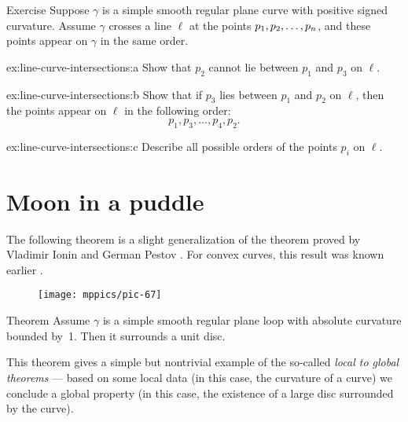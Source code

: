 \begin{thm}{Exercise}\label{ex:line-curve-intersections}
Suppose $\gamma$ is a simple smooth regular plane curve with positive signed curvature.
Assume $\gamma$ crosses a line $\ell$ at the points $p_1,p_2,\z\dots, p_n$, and these points appear on $\gamma$ in the same order.

\begin{subthm}{ex:line-curve-intersections:a}
Show that $p_2$ cannot lie between $p_1$ and $p_3$ on $\ell$.
\end{subthm}

\begin{subthm}{ex:line-curve-intersections:b}
Show that if $p_3$ lies between $p_1$ and $p_2$ on $\ell$, then the points appear on $\ell$ in the following order:  
\[p_1,p_3,\dots,p_4 ,p_2.\]

\end{subthm}

\begin{subthm}{ex:line-curve-intersections:c}
Describe all possible orders of the points $p_i$ on $\ell$.

\end{subthm}

\end{thm}

\section{Moon in a puddle}

The following theorem is a slight generalization of the theorem proved by Vladimir Ionin and German Pestov \cite{ionin-pestov}.
For convex curves, this result was known earlier \cite[\S 24]{blaschke}.


\begin{wrapfigure}{r}{18 mm}
\vskip-6mm
\centering
\texttt{[image: mppics/pic-67]}
\vskip0mm
\end{wrapfigure}

\begin{thm}{Theorem}\label{thm:moon-orginal}
Assume $\gamma$ is a simple smooth regular plane loop with absolute curvature bounded by~1.
Then it surrounds a unit disc.
\end{thm}

This theorem gives a simple but nontrivial example of the so-called \emph{local to global theorems} --- based on some local data (in this case, the curvature of a curve) we conclude a global property (in this case, the existence of a large disc surrounded by the curve).

